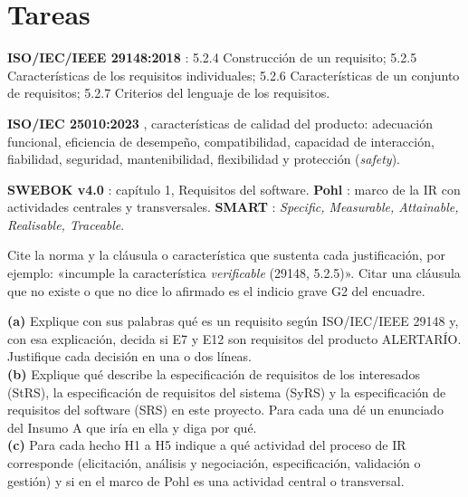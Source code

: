 \documentclass[11pt]{article}
\newcommand{\seccion}[1]{\section{\textcolor{utegreendk}{#1}}}
\begin{document}
	\seccion{Tareas}
	
	\begin{cajaclave}[title={Referencias que puede citar (sin consultar los documentos)}]
		\textbf{ISO/IEC/IEEE 29148:2018} \citep{iso29148_2018}: 5.2.4 Construcción de un requisito; 5.2.5 Características de los requisitos individuales; 5.2.6 Características de un conjunto de requisitos; 5.2.7 Criterios del lenguaje de los requisitos.\par
		\textbf{ISO/IEC 25010:2023} \citep{iso25010_2023}, características de calidad del producto: adecuación funcional, eficiencia de desempeño, compatibilidad, capacidad de interacción, fiabilidad, seguridad, mantenibilidad, flexibilidad y protección (\emph{safety}).\par
		\textbf{SWEBOK v4.0} \citep{swebok_v4_2024}: capítulo 1, Requisitos del software. \textbf{Pohl} \citep{pohl_2025}: marco de la IR con actividades centrales y transversales. \textbf{SMART} \citep{mannion_smart_1995}: \emph{Specific, Measurable, Attainable, Realisable, Traceable}.\par
		Cite la norma y la cláusula o característica que sustenta cada justificación, por ejemplo: «incumple la característica \emph{verificable} (29148, 5.2.5)». Citar una cláusula que no existe o que no dice lo afirmado es el indicio grave G2 del encuadre.
	\end{cajaclave}
	
	\begin{cajatarea}[title={T1. Conceptos aplicados al caso \hfill D1 · 10\,\%}]
		\textbf{(a)} Explique con sus palabras qué es un requisito según ISO/IEC/IEEE 29148 y, con esa explicación, decida si E7 y E12 son requisitos del producto ALERTARÍO. Justifique cada decisión en una o dos líneas.\\[4pt]
		\textbf{(b)} Explique qué describe la especificación de requisitos de los interesados (StRS), la especificación de requisitos del sistema (SyRS) y la especificación de requisitos del software (SRS) en este proyecto. Para cada una dé un enunciado del Insumo A que iría en ella y diga por qué.\\[4pt]
		\textbf{(c)} Para cada hecho H1 a H5 indique a qué actividad del proceso de IR corresponde (elicitación, análisis y negociación, especificación, validación o gestión) y si en el marco de Pohl es una actividad central o transversal.
	\end{cajatarea}
	
\end{document}
